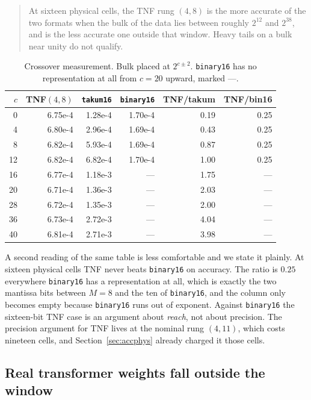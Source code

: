 \documentclass[11pt]{article}
\theoremstyle{definition}
\begin{document}
\begin{quote}
At sixteen physical cells, the TNF rung $(4,8)$ is the more accurate of the two
formats when the bulk of the data lies between roughly $2^{12}$ and $2^{38}$, and
is the less accurate one outside that window. Heavy tails on a bulk near unity do
not qualify.
\end{quote}

\begin{table}[htbp]\centering\small
\caption{Crossover measurement. Bulk placed at $2^{c\pm 2}$. \texttt{binary16}
has no representation at all from $c=20$ upward, marked ---.}
\label{tab:window}
\begin{tabular}{rrrrrr}
\hline
$c$ & TNF$(4,8)$ & \texttt{takum16} & \texttt{binary16} & TNF/takum & TNF/bin16 \\
\hline
0 & 6.75e-4 & 1.28e-4 & 1.70e-4 & 0.19 & 0.25 \\
4 & 6.80e-4 & 2.96e-4 & 1.69e-4 & 0.43 & 0.25 \\
8 & 6.82e-4 & 5.93e-4 & 1.69e-4 & 0.87 & 0.25 \\
12 & 6.82e-4 & 6.82e-4 & 1.70e-4 & 1.00 & 0.25 \\
16 & 6.77e-4 & 1.18e-3 & --- & 1.75 & --- \\
20 & 6.71e-4 & 1.36e-3 & --- & 2.03 & --- \\
28 & 6.72e-4 & 1.35e-3 & --- & 2.00 & --- \\
36 & 6.73e-4 & 2.72e-3 & --- & 4.04 & --- \\
40 & 6.81e-4 & 2.71e-3 & --- & 3.98 & --- \\
\hline
\end{tabular}
\end{table}

A second reading of the same table is less comfortable and we state it plainly. At
sixteen physical cells TNF never beats \texttt{binary16} on accuracy. The ratio is
$0.25$ everywhere \texttt{binary16} has a representation at all, which is exactly
the two mantissa bits between $M{=}8$ and the ten of \texttt{binary16}, and the
column only becomes empty because \texttt{binary16} runs out of exponent. Against
\texttt{binary16} the sixteen-bit TNF case is an argument about \emph{reach}, not
about precision. The precision argument for TNF lives at the nominal rung
$(4,11)$, which costs nineteen cells, and Section~\ref{sec:accphys} already charged
it those cells.

\subsection{Real transformer weights fall outside the window}
\end{document}
